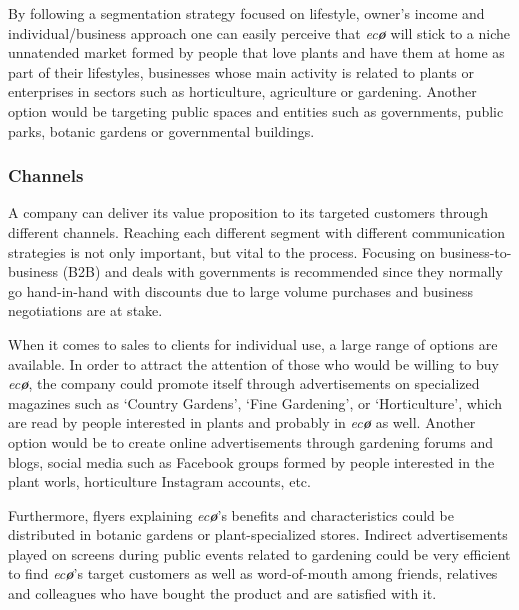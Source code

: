 \documentclass[english,runningheads,a4paper]{llncs}[2018/03/10]
\begin{document}
        By following a segmentation strategy focused on lifestyle, owner's
        income and individual/business approach one can easily perceive that
        \textit{ec\textbf{\o}} will stick to a niche unnatended market formed by
        people that love plants and have them at home as part of their
        lifestyles, businesses whose main activity is related to plants or
        enterprises in sectors such as horticulture, agriculture or gardening.
        Another option would be targeting public spaces and entities such as
        governments, public parks, botanic gardens or governmental buildings.


        \subsubsection*{Channels}

        A company can deliver its value proposition to its targeted customers
        through different channels. Reaching each different segment with
        different communication strategies is not only important, but vital to
        the process. Focusing on business-to-business (B2B) and deals with
        governments is recommended since they normally go hand-in-hand with
        discounts due to large volume purchases and business negotiations are at
        stake.

        When it comes to sales to clients for individual use, a large range of
        options are available. In order to attract the attention of those who
        would be willing to buy \textit{ec\textbf{\o}}, the company could
        promote itself through advertisements on specialized magazines such as
        `Country Gardens', `Fine Gardening', or `Horticulture', which are read
        by people interested in plants and probably in \textit{ec\textbf{\o}} as
        well. Another option would be to create online advertisements through
        gardening forums and blogs, social media such as Facebook groups formed
        by people interested in the plant worls, horticulture Instagram
        accounts, etc.

        Furthermore, flyers explaining \textit{ec\textbf{\o}}'s benefits and
        characteristics could be distributed in botanic gardens or
        plant-specialized stores. Indirect advertisements played on screens
        during public events related to gardening could be very efficient to
        find \textit{ec\textbf{\o}}'s target customers as well as word-of-mouth
        among friends, relatives and colleagues who have bought the product and
        are satisfied with it.
\end{document}
